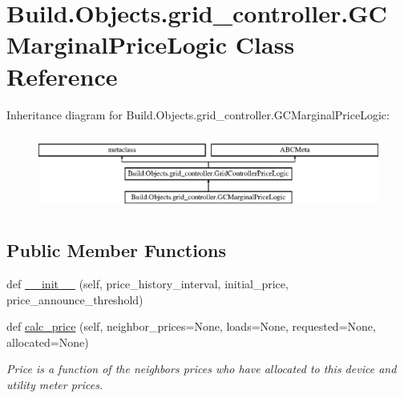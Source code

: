 \hypertarget{class_build_1_1_objects_1_1grid__controller_1_1_g_c_marginal_price_logic}{}\section{Build.\+Objects.\+grid\+\_\+controller.\+G\+C\+Marginal\+Price\+Logic Class Reference}
\label{class_build_1_1_objects_1_1grid__controller_1_1_g_c_marginal_price_logic}
Inheritance diagram for Build.\+Objects.\+grid\+\_\+controller.\+G\+C\+Marginal\+Price\+Logic\+:\begin{figure}[H]
\begin{center}
\leavevmode
\includegraphics[height=2.568807cm]{class_build_1_1_objects_1_1grid__controller_1_1_g_c_marginal_price_logic}
\end{center}
\end{figure}
\subsection*{Public Member Functions}
\begin{DoxyCompactItemize}
\item 
def \hyperlink{class_build_1_1_objects_1_1grid__controller_1_1_g_c_marginal_price_logic_a5435c8f548b19bbc4ef6b596f49ea6ce}{\+\_\+\+\_\+init\+\_\+\+\_\+} (self, price\+\_\+history\+\_\+interval, initial\+\_\+price, price\+\_\+announce\+\_\+threshold)
\item 
def \hyperlink{class_build_1_1_objects_1_1grid__controller_1_1_g_c_marginal_price_logic_a9a5f8b1d25f916868bf8da79e12406ed}{calc\+\_\+price} (self, neighbor\+\_\+prices=None, loads=None, requested=None, allocated=None)
\begin{DoxyCompactList}\small\item\em Price is a function of the neighbors prices who have allocated to this device and utility meter prices. \end{DoxyCompactList}\end{DoxyCompactItemize}


